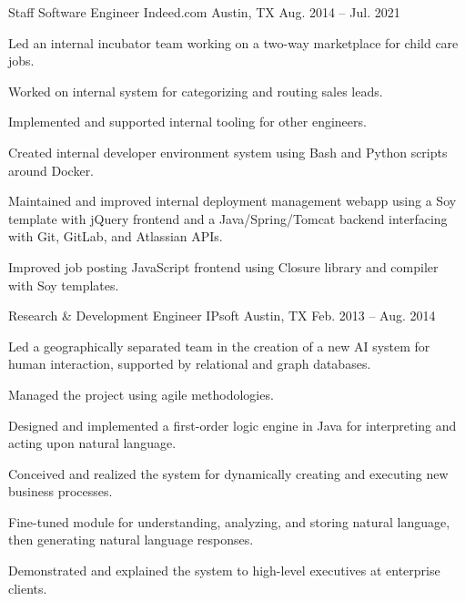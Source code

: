 \begin{cventries}
  \cventry
    {Staff Software Engineer} %
    {Indeed.com} %
    {Austin, TX} %
    {Aug. 2014 – Jul. 2021} %
    {
      \begin{cvitems} %
        \item {Led an internal incubator team working on a two-way marketplace for child care jobs.}
        \item {Worked on internal system for categorizing and routing sales leads.}
        \item {Implemented and supported internal tooling for other engineers.}
        \item {Created internal developer environment system using Bash and Python scripts around Docker.}
        \item {Maintained and improved internal deployment management webapp using a Soy template with jQuery frontend and a Java/Spring/Tomcat backend interfacing with Git, GitLab, and Atlassian APIs.}
        \item {Improved job posting JavaScript frontend using Closure library and compiler with Soy templates.}
      \end{cvitems}
    }

  \cventry
    {Research \& Development Engineer} %
    {IPsoft} %
    {Austin, TX} %
    {Feb. 2013 – Aug. 2014} %
    {
      \begin{cvitems} %
        \item {Led a geographically separated team in the creation of a new AI system for human interaction, supported by relational and graph databases.}
        \item {Managed the project using agile methodologies.}
        \item {Designed and implemented a first-order logic engine in Java for interpreting and acting upon natural language.}
        \item {Conceived and realized the system for dynamically creating and executing new business processes.}
        \item {Fine-tuned module for understanding, analyzing, and storing natural language, then generating natural language responses.}
        \item {Demonstrated and explained the system to high-level executives at enterprise clients.}
      \end{cvitems}
    }


\end{cventries}
